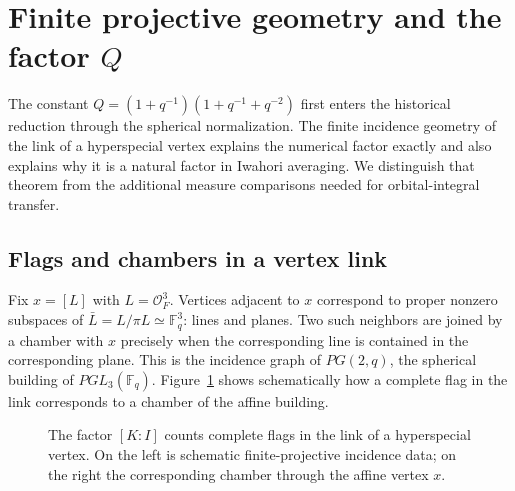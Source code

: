 \documentclass[12pt,letterpaper]{amsart}
\numberwithin{equation}{section}
\theoremstyle{definition}
\theoremstyle{plain}
\begin{document}
\section{Finite projective geometry and the factor $Q$}
\label{sec:new-flags}

The constant
$Q=(1+q^{-1})(1+q^{-1}+q^{-2})$
first enters the historical reduction through the spherical
normalization. The finite incidence geometry of the link of a
hyperspecial vertex explains the numerical factor exactly and
also explains why it is a natural factor in Iwahori averaging.
We distinguish that theorem from the additional measure comparisons
needed for orbital-integral transfer.

\subsection{Flags and chambers in a vertex link}
Fix $x=[L]$ with $L=\mathcal O_F^3$. Vertices adjacent to $x$
correspond to proper nonzero subspaces of
$\bar L=L/\pi L\simeq\mathbb F_q^3$:
lines and planes. Two such neighbors are joined by a chamber
with $x$ precisely when the corresponding line is contained in
the corresponding plane. This is the incidence graph of
$PG(2,q)$, the spherical building of $PGL_3(\mathbb F_q)$.
Figure~\ref{fig:new-flag-chamber} shows schematically how a complete flag in the link corresponds to a chamber of the affine building.


\begin{figure}[htbp]
\centering
{}
\caption{The factor $[K:I]$ counts complete flags in the link of a hyperspecial vertex. On the left is schematic finite-projective incidence data; on the right the corresponding chamber through the affine vertex $x$.\label{fig:new-flag-chamber}}
\end{figure}
\end{document}

